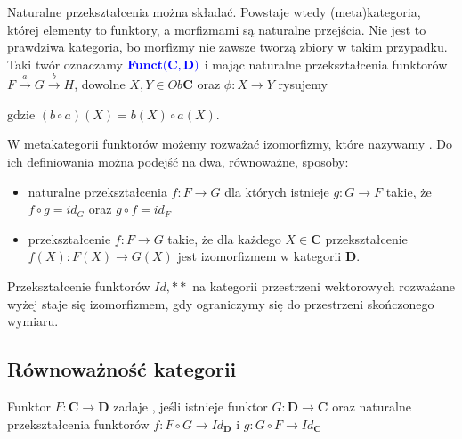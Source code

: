Naturalne przekształcenia można składać. Powstaje wtedy (meta)kategoria, której elementy to funktory, a morfizmami są naturalne przejścia. Nie jest to prawdziwa kategoria, bo morfizmy nie zawsze tworzą zbiory w takim przypadku. Taki twór oznaczamy $\color{blue}\mathbf{Funct}(\mathbf{C},\mathbf{D})$ i mając naturalne przekształcenia funktorów $F\overset{a}{\to} G\overset{b}{\to}H$, dowolne $X,Y\in Ob\mathbf{C}$ oraz $\phi:X\to Y$ rysujemy
\begin{center}
\end{center}
gdzie $(b\circ a)(X)=b(X)\circ a(X)$.

\begin{definition}
  W metakategorii funktorów możemy rozważać izomorfizmy, które nazywamy . Do ich definiowania można podejść na dwa, równoważne, sposoby:
  \begin{itemize}
    \item naturalne przekształcenia $f:F\to G$ dla których istnieje $g:G\to F$ takie, że $f\circ g=id_G$ oraz $g\circ f=id_F$
    \item przekształcenie $f:F\to G$ takie, że dla każdego $X\in\mathbf{C}$ przekształcenie $f(X):F(X)\to G(X)$ jest izomorfizmem w kategorii $\mathbf{D}$.
  \end{itemize}
\end{definition}

\begin{example}
  \item Przekształcenie funktorów $Id, **$ na kategorii przestrzeni wektorowych rozważane wyżej staje się izomorfizmem, gdy ograniczymy się do przestrzeni skończonego wymiaru.
\end{example}

\subsection{Równoważność kategorii}

\begin{definition}
  Funktor $F:\mathbf{C}\to\mathbf{D}$ zadaje , jeśli istnieje funktor $G:\mathbf{D}\to\mathbf{C}$ oraz naturalne przekształcenia funktorów $f:F\circ G\to Id_{\mathbf{D}}$ i $g:G\circ F\to Id_{\mathbf{C}}$
\end{definition}

